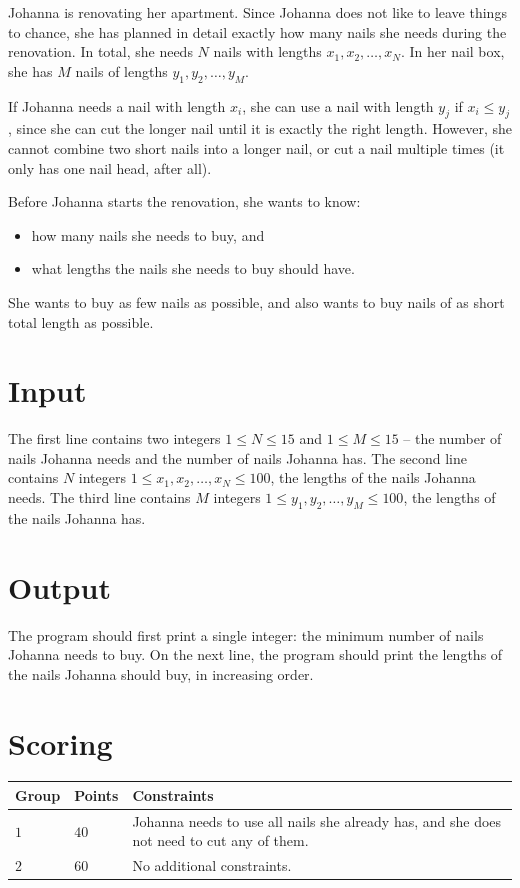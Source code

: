 \noindent
Johanna is renovating her apartment.
Since Johanna does not like to leave things to chance, she has planned
in detail exactly how many nails she needs during the renovation.
In total, she needs $N$ nails with lengths $x_1, x_2, \dots, x_N$.
In her nail box, she has $M$ nails of lengths $y_1, y_2, \dots, y_M$.

If Johanna needs a nail with length $x_i$, she can use a nail with
length $y_j$ if $x_i \le y_j$, since she can cut the longer nail
until it is exactly the right length.
However, she cannot combine two short nails into a longer nail,
or cut a nail multiple times (it only has one nail head, after all).

Before Johanna starts the renovation, she wants to know:
\begin{itemize}
    \item how many nails she needs to buy, and
    \item what lengths the nails she needs to buy should have.
\end{itemize}

She wants to buy as few nails as possible, and also wants
to buy nails of as short total length as possible.

\section*{Input}
The first line contains two integers $1 \le N \le 15$ and $1 \le M \le 15$ -- the number of nails Johanna needs and the number of nails Johanna has.
The second line contains $N$ integers $1 \le x_1, x_2, \dots, x_N \le 100$, the lengths of the nails Johanna needs.
The third line contains $M$ integers $1 \le y_1, y_2, \dots, y_M \le 100$, the lengths of the nails Johanna has.

\section*{Output}
The program should first print a single integer: the minimum number of nails Johanna needs to buy.
On the next line, the program should print the lengths of the nails Johanna should buy, in increasing order.

\section*{Scoring}
\noindent
\begin{tabular}{| l | l | p{12cm} |}
  \hline
  \textbf{Group} & \textbf{Points} & \textbf{Constraints} \\ \hline
  $1$    & $40$       & Johanna needs to use all nails she already has,
  and she does not need to cut any of them. \\ \hline
  $2$    & $60$       & No additional constraints. \\ \hline
\end{tabular}

